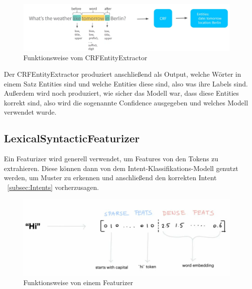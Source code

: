 \begin{figure}[hbt!]
    \centering
    \includegraphics[scale=0.35]{pics/crf-entity-extractor}
    \caption{Funktionsweise vom CRFEntityExtractor~\cite{pipelineComponentsYoutube}}
    \label{fig:CRFEntityExtractor}
\end{figure}

Der CRFEntityExtractor produziert anschließend als Output, welche Wörter in einem Satz Entities sind und welche Entities diese sind, also was ihre Labels sind.
Außerdem wird noch produziert, wie sicher das Modell war, dass diese Entities korrekt sind, also wird die sogenannte Confidence ausgegeben und welches Modell verwendet wurde.\cite{crfEntityExtractor, pipelineComponentsYoutube, regexFeaturizerCrf}

\subsection{LexicalSyntacticFeaturizer}\label{subsec:lexical-syntactic-featurizer}

Ein Featurizer wird generell verwendet, um Features von den Tokens zu extrahieren.
Diese können dann von dem Intent-Klassifikations-Modell genutzt werden, um Muster zu erkennen und anschließend den korrekten Intent ~\ref{subsec:Intents} vorherzusagen.\cite{lexicalSyntacticFeaturizer, pipelineComponentsYoutube, pipelineConfigurationVideo}

\begin{figure}[hbt!]
    \centering
    \includegraphics[scale=0.5]{pics/featurizer}
    \caption{Funktionsweise von einem Featurizer~\cite{pipelineConfigurationVideo}}
    \label{fig:Featurizer}
\end{figure}


